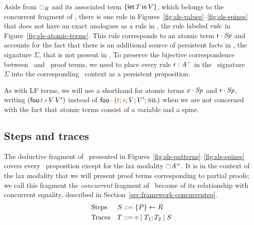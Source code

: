 Aside from ${\ocircle}_R$ and its associated term $\{{\sf let}\,{T}\,{\sf in}\, {V} \}$,
which belongs to the concurrent fragment of \sls, there is one rule in
Figures~\ref{fig:sls-values}--\ref{fig:sls-spines} that does not have
an exact analogues as a rule in \ollll, the rule labeled ${\it rule}$ in
Figure~\ref{fig:sls-atomic-terms}. This rule corresponds to an atomic
term ${\sf r} \cdot {{\it Sp}}$ and accounts for the fact that there is an
additional source of persistent facts in \sls, the signature $\Sigma$,
that is not present in \ollll.  To preserve the bijective
correspondence between \ollll~and \sls~proof terms, we need to place
every rule ${\sf r} : A^-$ in the \sls~signature $\Sigma$ into the
corresponding \ollll~context as a persistent proposition.

As with LF terms, we will use a shorthand for atomic terms
${x} \cdot {{\it Sp}}$ and ${\sf r} \cdot {{\it Sp}}$, writing $({\sf
  foo}\,\lf{t}\,\lf{s}\,V\,V')$ instead of $\tfocusl{\sf
  foo}{(\lf{t};\lf{s};V;V';\tnil)}$ when we are not concerned with the
fact that atomic terms consist of a variable and a spine.



\subsection{Steps and traces}
\label{sec:framework-concurrent}

The deductive fragment of \sls~presented in
Figures~\ref{fig:sls-patterns}--\ref{fig:sls-spines} covers every
\sls~proposition except for the lax modality ${\ocircle}A^+$. It is in
the context of the lax modality that we will present proof terms
corresponding to partial proofs; we call this fragment the {\it
  concurrent} fragment of \sls~because of its relationship with
concurrent equality, described in
Section~\ref{sec:framework-concurrenteq}.
\begin{align*}
\qquad\qquad\qquad\qquad
&\mbox{Steps}&
S & ::= \{{P}\} \leftarrow {R}
\qquad\qquad\qquad\qquad
\\
&\mbox{Traces}&
T & ::= \diamond \mid T_1; T_2 \mid S
\end{align*}

